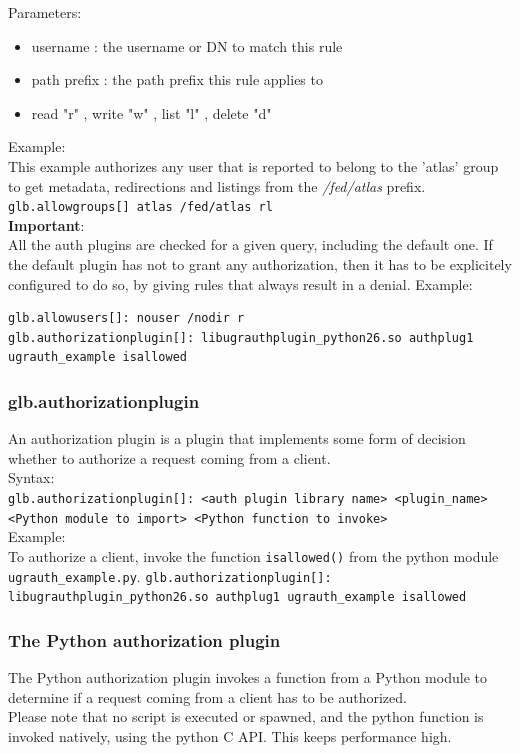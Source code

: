 \documentclass[12pt]{article} %
\begin{document}
Parameters:\\
\begin{itemize}
 \item username : the username or DN to match this rule
 \item path prefix : the path prefix this rule applies to
 \item read "r" , write "w" , list "l" , delete "d"
\end{itemize}

Example:\\
This example authorizes any user that is reported to belong to the 'atlas' group to get metadata, redirections and listings from
the \textit{/fed/atlas} prefix.\\
\lstinline"glb.allowgroups[] atlas /fed/atlas rl" \\


\textbf{Important}:\\ All the auth plugins are checked for a given query, including the default one. If the default plugin has not to grant any authorization, then it has to
be explicitely configured to do so, by giving rules that always result in a denial. Example:\\
\begin{lstlisting}
glb.allowusers[]: nouser /nodir r
glb.authorizationplugin[]: libugrauthplugin_python26.so authplug1 ugrauth_example isallowed
\end{lstlisting}

\subsubsection{glb.authorizationplugin}
An authorization plugin is a plugin that implements some form of decision whether to authorize a request coming from a client.
\\
Syntax:\\
\lstinline"glb.authorizationplugin[]: <auth plugin library name> <plugin_name>  <Python module to import> <Python function to invoke>"
\\
Example:\\
To authorize a client, invoke the function \lstinline"isallowed()" from the python module \lstinline"ugrauth_example.py".
\lstinline"glb.authorizationplugin[]: libugrauthplugin_python26.so authplug1 ugrauth_example isallowed"




\subsubsection{The Python authorization plugin}
The Python authorization plugin invokes a function from a Python module to determine if a request coming from a client has to be authorized.\\
Please note that no script is executed or spawned, and the python function is invoked natively, using the python C API. This keeps performance high.\\
\end{document}

